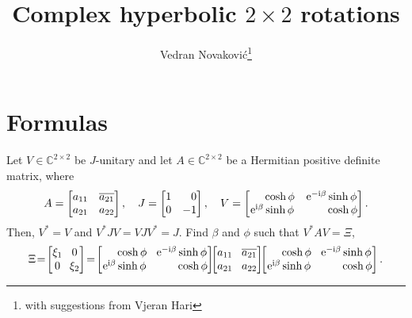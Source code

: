 \documentclass[a4paper,12pt,twoside]{article}
\title{Complex hyperbolic $2\times 2$ rotations}
\author{Vedran Novakovi\'{c}\footnote{with suggestions from Vjeran Hari}}
\begin{document}
\maketitle
\section{Formulas}
Let $V\in\mathbb{C}^{2\times 2}$ be $J$-unitary and let
$A\in\mathbb{C}^{2\times 2}$ be a Hermitian positive definite matrix,
where
\begin{equation}
  A=\begin{bmatrix}
  a_{11} & \overline{a_{21}}\\
  a_{21} & a_{22}
  \end{bmatrix},\quad
  J=\begin{bmatrix}
  1 & \hphantom{-}0\\
  0 & -1
  \end{bmatrix},\quad
  V=\begin{bmatrix}
  \hphantom{\mathrm{e}^{\mathrm{i}\beta}}\cosh\phi & \mathrm{e}^{-\mathrm{i}\beta}\sinh\phi\\
  \mathrm{e}^{\mathrm{i}\beta}\sinh\phi & \hphantom{\mathrm{e}^{-\mathrm{i}\beta}}\cosh\phi
  \end{bmatrix}.
  \label{e:1}
\end{equation}
Then, $V^{\ast}=V$ and $V^{\ast}JV=VJV^{\ast}=J$.  Find $\beta$ and
$\phi$ such that $V^{\ast}AV=\Xi$,
\begin{equation}
  \Xi\!=\!\begin{bmatrix}
  \xi_1 & \!\!0\\
  0 & \!\!\xi_2
  \end{bmatrix}\!=\!\begin{bmatrix}
  \hphantom{\mathrm{e}^{\mathrm{i}\beta}}\cosh\phi & \!\mathrm{e}^{-\mathrm{i}\beta}\sinh\phi\\
  \mathrm{e}^{\mathrm{i}\beta}\sinh\phi & \!\hphantom{\mathrm{e}^{-\mathrm{i}\beta}}\cosh\phi
  \end{bmatrix}\!\!\begin{bmatrix}
  a_{11} & \!\overline{a_{21}}\\
  a_{21} & \!a_{22}
  \end{bmatrix}\!\!\begin{bmatrix}
  \hphantom{\mathrm{e}^{\mathrm{i}\beta}}\cosh\phi & \!\mathrm{e}^{-\mathrm{i}\beta}\sinh\phi\\
  \mathrm{e}^{\mathrm{i}\beta}\sinh\phi & \!\hphantom{\mathrm{e}^{-\mathrm{i}\beta}}\cosh\phi
  \end{bmatrix}.
  \label{e:2}
\end{equation}
\end{document}
